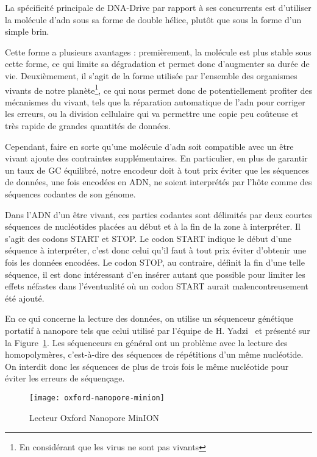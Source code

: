 \documentclass[a4paper]{report}
\begin{document}
La spécificité principale de DNA-Drive par rapport à ses concurrents
est d'utiliser la molécule d'\ac{adn} sous sa forme de double hélice,
plutôt que sous la forme d'un simple brin.

Cette forme a plusieurs avantages : 
premièrement, la molécule est plus stable sous cette forme,
ce qui limite sa dégradation et permet donc d'augmenter sa durée de vie.
Deuxièmement, il s'agit de la forme utilisée par l'ensemble des organismes vivants
de notre planète\footnote{En considérant que les virus ne sont pas vivants},
ce qui nous permet donc de potentiellement profiter des mécanismes du vivant,
tels que la réparation automatique de l’\ac{adn} pour corriger les erreurs,
ou la division cellulaire qui va permettre une copie peu coûteuse et très rapide de grandes quantités de données.

Cependant, faire en sorte qu'une molécule d'\ac{adn} soit compatible avec un être vivant ajoute des contraintes supplémentaires.
En particulier, en plus de garantir un taux de GC équilibré,
notre encodeur doit à tout prix éviter que les séquences de données, une fois encodées en ADN,
ne soient interprétés par l'hôte comme des séquences codantes de son génome.

Dans l'ADN d'un être vivant, ces parties codantes sont délimités par
deux courtes séquences de nucléotides placées au début et à la fin de la zone à interpréter.
Il s'agit des codons START et STOP.
Le codon START indique le début d'une séquence à interpréter,
c'est donc celui qu'il faut à tout prix éviter d'obtenir une fois les données encodées.
Le codon STOP, au contraire, définit la fin d'une telle séquence,
il est donc intéressant d'en insérer autant que possible pour limiter les effets néfastes
dans l'éventualité où un codon START aurait malencontreusement été ajouté.

En ce qui concerne la lecture des données, on utilise un séquenceur génétique portatif à
nanopore tels que celui utilisé par l’équipe de H. Yadzi~\cite{yazdi2017portable} et présenté sur la Figure~\ref{fig:oxford-nanopore-minion}.
Les séquenceurs en général ont un problème avec la lecture des homopolymères, c’est-à-dire des
séquences de répétitions d’un même nucléotide. On interdit donc les séquences de plus de trois fois
le même nucléotide pour éviter les erreurs de séquençage.

\begin{figure}[ht]
\centering
\texttt{[image: oxford-nanopore-minion]}
\caption{Lecteur Oxford Nanopore MinION}
\label{fig:oxford-nanopore-minion}
\end{figure}
\end{document}
